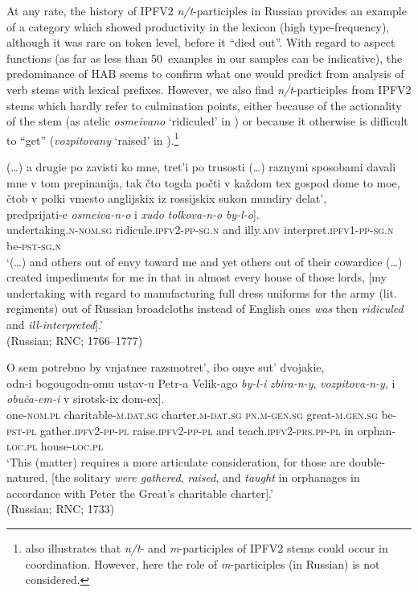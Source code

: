 \documentclass[output=paper]{langscibook}
\begin{document}
\noindent At any rate, the history of IPFV2 \textit{n/t}-participles in Russian provides an example of a category which showed productivity in the lexicon (high type-frequency), although it was rare on token level, before it “died out”. With regard to aspect functions (as far as less than 50~examples in our samples can be indicative), the predominance of HAB seems to confirm what one would predict from  analysis of verb stems with lexical prefixes. However, we also find \textit{n/t}-participles from IPFV2 stems which hardly refer to culmination points, either because of the actionality of the stem (as atelic \textit{osmeivano} `ridiculed' in ) or because it otherwise is difficult to “get” (\textit{vozpitovany} `raised' in ).\footnote{ also illustrates that \textit{n/t}- and \textit{m}-participles of IPFV2 stems could occur in coordination. However, here the role of \textit{m}-participles (in Russian) is not considered.} 

\ea\label{wiem:ex:ridiculed}{{(…) a drugie po zavisti ko mne, tret'i po trusosti (…) raznymi sposobami davali mne v tom prepinanija, tak čto togda počti v každom tex gospod dome to moe, čtob v polki vmesto anglijskix iz rossijskix sukon mundiry delat’,}\\ 
\gll \minsp{[} {predprijati-e} {\textit{osmeiva-n-o}} {i} {\textit{xudo}} {\textit{tolkova-n-o}} {\textit{by-l-o}}].\\
{} undertaking\textsc{.n-nom.sg} ridicule.\textsc{ipfv2-pp-sg.n} and illy.\textsc{adv} interpret.\textsc{ipfv1-pp-sg.n} be-\textsc{pst-sg.n}\\
\glt ‘(…) and others out of envy toward me and yet others out of their cowardice (…) created impediments for me in that in almost every house of those lords, [my undertaking with regard to manufacturing full dress uniforms for the army (lit. regiments) out of Russian broadcloths instead of English ones \textit{was} then \textit{ridiculed} and \textit{ill-interpreted}].’ \\
\hfill (Russian; RNC; 1766--1777)
}
\z

\ea\label{wiem:ex:gathered}{{O sem potrebno by vnjatnee razsmotret’, ibo onye sut’ dvojakie,}\\ 
\gll \minsp{[} {odn-i} {bogougodn-omu} {ustav-u} {Petr-a} {Velik-ago} {\textit{by-l-i}} {\textit{zbira-n-y}}, {\textit{vozpitova-n-y}}, {i} {\textit{obuča-em-i}} {v} {sirotsk-ix} {dom-ex}].\\
{} one-\textsc{nom.pl} charitable-\textsc{m.dat.sg} charter\textsc{.m-dat.sg} \textsc{pn.m-gen.sg} great-\textsc{m.gen.sg} be-\textsc{pst-pl} gather.\textsc{ipfv2-pp-pl} raise.\textsc{ipfv2-pp-pl} and teach.\textsc{ipfv2-prs.pp-pl} in orphan-\textsc{loc.pl} house-\textsc{loc.pl}\\
\glt ‘This (matter) requires a more articulate consideration, for those are double-natured, [the solitary \textit{were gathered}, \textit{raised}, and \textit{taught} in orphanages in accordance with Peter the Great’s charitable charter].’ \\\hfill (Russian; RNC; 1733)
}
\z
\end{document}
